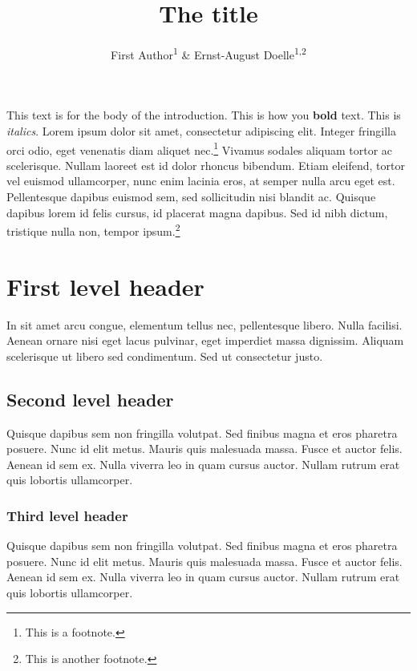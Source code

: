 \documentclass[
  english,
  man]{apa6}
\title{The title}
\author{First Author\textsuperscript{1} \& Ernst-August Doelle\textsuperscript{1,2}}
\date{}
\affiliation{\vspace{0.5cm}\textsuperscript{1} Wilhelm-Wundt-University\\\textsuperscript{2} Konstanz Business School}
\begin{document}
\maketitle

This text is for the body of the introduction. This is how you \textbf{bold} text. This is \emph{italics}. Lorem ipsum dolor sit amet, consectetur adipiscing elit. Integer fringilla orci odio, eget venenatis diam aliquet nec.\footnote{This is a footnote.} Vivamus sodales aliquam tortor ac scelerisque. Nullam laoreet est id dolor rhoncus bibendum. Etiam eleifend, tortor vel euismod ullamcorper, nunc enim lacinia eros, at semper nulla arcu eget est. Pellentesque dapibus euismod sem, sed sollicitudin nisi blandit ac. Quisque dapibus lorem id felis cursus, id placerat magna dapibus. Sed id nibh dictum, tristique nulla non, tempor ipsum.\footnote{This is another footnote.}

\hypertarget{first-level-header}{%
\section{First level header}\label{first-level-header}}

In sit amet arcu congue, elementum tellus nec, pellentesque libero. Nulla facilisi. Aenean ornare nisi eget lacus pulvinar, eget imperdiet massa dignissim. Aliquam scelerisque ut libero sed condimentum. Sed ut consectetur justo.

\hypertarget{second-level-header}{%
\subsection{Second level header}\label{second-level-header}}

Quisque dapibus sem non fringilla volutpat. Sed finibus magna et eros pharetra posuere. Nunc id elit metus. Mauris quis malesuada massa. Fusce et auctor felis. Aenean id sem ex. Nulla viverra leo in quam cursus auctor. Nullam rutrum erat quis lobortis ullamcorper.

\hypertarget{third-level-header}{%
\subsubsection{Third level header}\label{third-level-header}}

Quisque dapibus sem non fringilla volutpat. Sed finibus magna et eros pharetra posuere. Nunc id elit metus. Mauris quis malesuada massa. Fusce et auctor felis. Aenean id sem ex. Nulla viverra leo in quam cursus auctor. Nullam rutrum erat quis lobortis ullamcorper.
\end{document}

